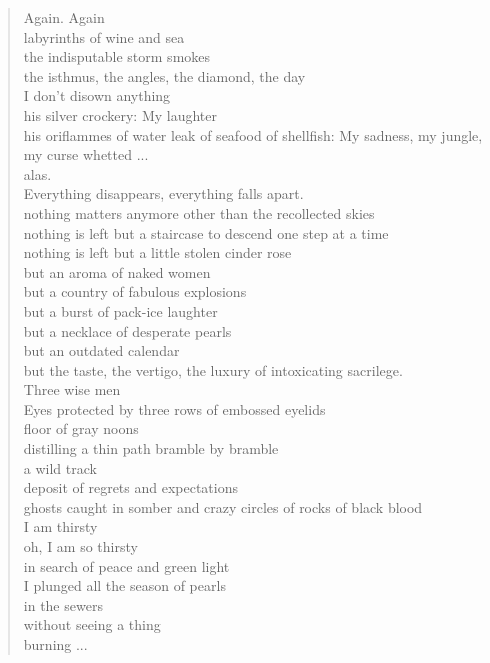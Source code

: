 \documentclass[letterpaper,article,12pt,oneside,notitlepage]{memoir}
\begin{document}
\begin{verse}
\hspace{1cm} Again. Again \\
labyrinths of wine and sea \\
the indisputable storm smokes \\
the isthmus, the angles, the diamond, the day \\
I don't disown anything \\
his silver crockery: My laughter \\
his oriflammes of water leak of seafood of shellfish: My sadness, my jungle, my curse whetted ... \\
alas. \\
Everything disappears, everything falls apart. \\
nothing matters anymore other than the recollected skies \\
nothing is left but a staircase to descend one step at a time \\
nothing is left but a little stolen cinder rose \\
but an aroma of naked women \\
but a country of fabulous explosions \\
but a burst of pack-ice laughter \\
but a necklace of desperate pearls \\
but an outdated calendar \\
but the taste, the vertigo, the luxury of intoxicating sacrilege. \\
Three wise men \\
Eyes protected by three rows of embossed eyelids \\
floor of gray noons \\
distilling a thin path bramble by bramble \\
a wild track \\
deposit of regrets and expectations \\
ghosts caught in somber and crazy circles of rocks of black blood \\
I am thirsty \\
oh, I am so thirsty \\
in search of peace and green light \\
I plunged all the season of pearls \\
in the sewers \\
without seeing a thing \\
burning ... \\
\end{verse}
\end{document}
